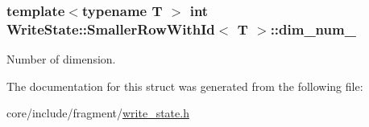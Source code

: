 \subsubsection[{dim\+\_\+num\+\_\+}]{\setlength{\rightskip}{0pt plus 5cm}template$<$typename T $>$ int {\bf Write\+State\+::\+Smaller\+Row\+With\+Id}$<$ T $>$\+::dim\+\_\+num\+\_\+}\label{structWriteState_1_1SmallerRowWithId_a9e9a8cf8799ae4272c3d9c699ac9a10d}
Number of dimension. 

The documentation for this struct was generated from the following file\+:\begin{DoxyCompactItemize}
\item 
core/include/fragment/\hyperlink{write__state_8h}{write\+\_\+state.\+h}\end{DoxyCompactItemize}
